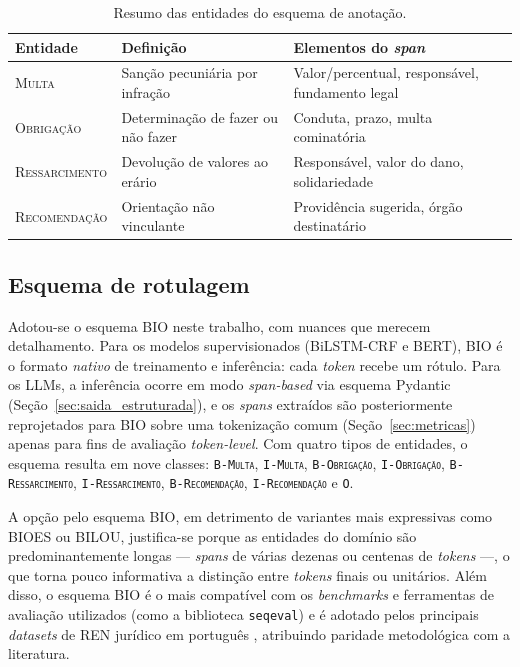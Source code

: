 \begin{table}[htbp]
\centering
\caption{Resumo das entidades do esquema de anotação.}
\label{tab:resumo_entidades}
\small
\begin{tabular}{p{3.8cm}p{4.5cm}p{5.2cm}}
\toprule
\textbf{Entidade} & \textbf{Definição} & \textbf{Elementos do \textit{span}} \\
\midrule
\textsc{Multa} & Sanção pecuniária por infração & Valor/percentual, responsável, fundamento legal \\
\textsc{Obrigação} & Determinação de fazer ou não fazer & Conduta, prazo, multa cominatória \\
\textsc{Ressarcimento} & Devolução de valores ao erário & Responsável, valor do dano, solidariedade \\
\textsc{Recomendação} & Orientação não vinculante & Providência sugerida, órgão destinatário \\
\bottomrule
\end{tabular}
\end{table}

\subsection{Esquema de rotulagem}
\label{sec:bio_scheme}

Adotou-se o esquema BIO neste trabalho, com nuances que merecem detalhamento. Para os modelos supervisionados (BiLSTM-CRF e BERT), BIO é o formato \emph{nativo} de treinamento e inferência: cada \textit{token} recebe um rótulo. Para os LLMs, a inferência ocorre em modo \emph{span-based} via esquema Pydantic (Seção~\ref{sec:saida_estruturada}), e os \textit{spans} extraídos são posteriormente reprojetados para BIO sobre uma tokenização comum (Seção~\ref{sec:metricas}) apenas para fins de avaliação \textit{token-level}. Com quatro tipos de entidades, o esquema resulta em nove classes: \texttt{B-\textsc{Multa}}, \texttt{I-\textsc{Multa}}, \texttt{B-\textsc{Obrigação}}, \texttt{I-\textsc{Obrigação}}, \texttt{B-\textsc{Ressarcimento}}, \texttt{I-\textsc{Ressarcimento}}, \texttt{B-\textsc{Recomendação}}, \texttt{I-\textsc{Recomendação}} e \texttt{O}.

A opção pelo esquema BIO, em detrimento de variantes mais expressivas como BIOES ou BILOU, justifica-se porque as entidades do domínio são predominantemente longas --- \textit{spans} de várias dezenas ou centenas de \textit{tokens} ---, o que torna pouco informativa a distinção entre \textit{tokens} finais ou unitários. Além disso, o esquema BIO é o mais compatível com os \textit{benchmarks} e ferramentas de avaliação utilizados (como a biblioteca \texttt{seqeval}) e é adotado pelos principais \textit{datasets} de REN jurídico em português \cite{Araujo2018,albuquerque2023ulyssesner}, atribuindo paridade metodológica com a literatura.

